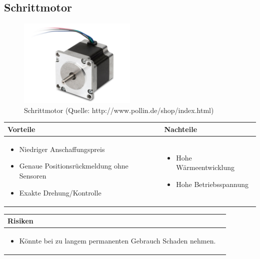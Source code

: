 \pagebreak


\subsection{Schrittmotor}

\begin{figure}[h!]%
\centering
\includegraphics[width=0.5\textwidth]{fig/schrittmotor.JPG}
\caption{Schrittmotor (Quelle: http://www.pollin.de/shop/index.html)}
\label{fig:Java}
\end{figure}

\begin{table}[h]
\begin{tabular}{p{} | p{}}


 \textbf{Vorteile} & \textbf{Nachteile} \\ \hline
	 
\begin{itemize}
\item Niedriger Anschaffungspreis
\item Genaue Positionsrückmeldung ohne Sensoren
\item Exakte Drehung/Kontrolle
\end{itemize}

 
 &
 
\begin{itemize}
\item Hohe Wärmeentwicklung
\item Hohe Betriebsspannung
\end{itemize}

\end{tabular}
\end{table}

\begin{table}[h]
\begin{tabular}{p{}p{}}


 \textbf{Risiken} & \\ \hline
	 
\begin{itemize}
\item Könnte bei zu langem permanenten Gebrauch Schaden nehmen.
\end{itemize}

 
\end{tabular}
\end{table}


